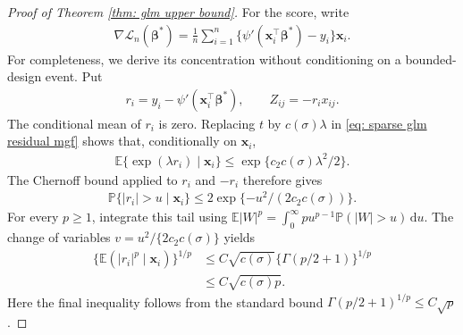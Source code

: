 \documentclass[letterpaper,12pt]{article}
\renewcommand{\d}{\mathrm{d}}
\numberwithin{equation}{section}
\theoremstyle{plain}
\numberwithin{Theorem}{section}
\numberwithin{proposition}{section}
\numberwithin{Lemma}{section}
{
	\theoremstyle{definition}
	\newtheorem{Definition}{Definition}
	\newtheorem{example}{Example}
	\numberwithin{example}{section}
	\newtheorem{fact}{Fact}
	\numberwithin{fact}{section}
	\newtheorem{remark}{Remark}
}
\newcommand{\1}{\mathbbm{1}}
\def\bbeta{{\boldsymbol{\beta}}}
\def\Pr{\mathbb P}
\def\E{\mathbb{E}}
\def\L{{\mathcal L}}
\begin{document}
\begin{proof}[Proof of Theorem \ref{thm: glm upper bound}]
For the score, write
\begin{align*}
    \nabla\L_n(\bbeta^*)
    =\frac1n\sum_{i=1}^n
    \{\psi'(\bm x_i^\top\bbeta^*)-y_i\}\bm x_i.
\end{align*}
For completeness, we derive its concentration without conditioning on
a bounded-design event.  Put
\begin{align*}
r_i=y_i-\psi'(\bm x_i^\top\bbeta^*),
\qquad Z_{ij}=-r_ix_{ij}.
\end{align*}
The conditional mean of \(r_i\) is zero.  Replacing \(t\) by
\(c(\sigma)\lambda\) in \eqref{eq: sparse glm residual mgf} shows that,
conditionally on \(\bm x_i\),
\begin{align*}
\E\{\exp(\lambda r_i)\mid\bm x_i\}
\leq\exp\{c_2c(\sigma)\lambda^2/2\}.
\end{align*}
The Chernoff bound applied to \(r_i\) and \(-r_i\) therefore gives
\begin{align}
\Pr\{|r_i|>u\mid\bm x_i\}
\leq2\exp\{-u^2/(2c_2c(\sigma))\}.                       \label{eq: sparse conditional residual tail}
\end{align}
For every \(p\geq1\), integrate this tail using
\(\E|W|^p=\int_0^\infty p u^{p-1}\Pr(|W|>u)\,\d u\).
The change of variables
\(v=u^2/\{2c_2c(\sigma)\}\) yields
\begin{align}
\{\E(|r_i|^p\mid\bm x_i)\}^{1/p}
&\leq C\sqrt{c(\sigma)}\{\Gamma(p/2+1)\}^{1/p}\\
&\leq C\sqrt{c(\sigma)p}.                                \label{eq: sparse conditional residual moments}
\end{align}
Here the final inequality follows from the standard bound
\(\Gamma(p/2+1)^{1/p}\leq C\sqrt p\).


\end{proof}
\end{document}
